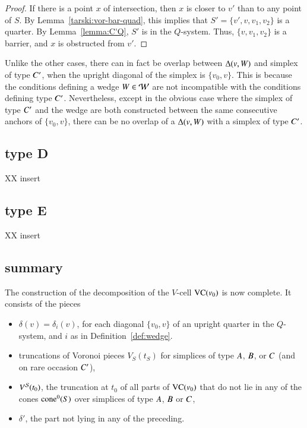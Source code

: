 \begin{proof} If there is a point $x$ of intersection, then
$x$ is closer to $v'$ than to any point of $S$. 
By Lemma~\ref{tarski:vor-bar-quad}, this implies that 
$S'=\{v',v,v_1,v_2\}$ is a quarter.  By Lemma~\ref{lemma:C'Q},
$S'$ is in the $Q$-system.  Thus, $\{v,v_1,v_2\}$ is a barrier,
and $x$ is obstructed from $v'$.
\end{proof}


Unlike the other cases, there can in fact be overlap between
$\Delta(v,W)$ and simplex of type $C'$, when the upright
diagonal of the simplex is $\{v_0,v\}$.  This is because the
conditions defining a wedge $W\in{\mathcal W}$ are not incompatible with
the conditions defining type $C'$.  Nevertheless, except in the
obvious case where the simplex of type $C'$ and the wedge are both
constructed between the same consecutive anchors of $\{v_0,v\}$, there
can be no overlap of a $\Delta(v,W)$ with a simplex of type
$C'$.

\subsection{type D}

XX insert

\subsection{type E}

XX insert


\subsection{summary}


The construction of the decomposition of the $V$-cell ${\operatorname{VC}}(v_0)$
is now complete. It consists of the pieces

    \begin{itemize}
    \item $\delta(v)=\delta_i(v)$,
         for each diagonal $\{v_0,v\}$ of an upright quarter
        in the $Q$-system, and $i$ as in Definition~\ref{def:wedge}.
    \item truncations of Voronoi pieces $V_S(t_S)$ for simplices of type
        $A$, $B$, or $C$ (and on rare occasion $C'$),
    \item $V^{{\mathcal S}}(t_0)$, the truncation at $t_0$ of all parts of
        ${\operatorname{VC}}(v_0)$ that do not lie in any of the cones ${\operatorname{cone}}^0(S)$ over
        simplices
        of type $A$, $B$ or $C$,
    \item $\delta'$, the part not lying in any of the preceding.
    \end{itemize}





